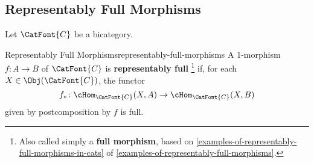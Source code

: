 \subsection{Representably Full Morphisms}\label{subsection-full-monomorphisms}
Let $\CatFont{C}$ be a bicategory.
\begin{definition}{Representably Full Morphisms}{representably-full-morphisms}%
    A $1$-morphism $f\colon A\to B$ of $\CatFont{C}$ is \textbf{representably full}%
    \footnote{%
        Also called simply a \textbf{full morphism}, based on \cref{examples-of-representably-full-morphisms-in-cats} of \cref{examples-of-representably-full-morphisms}.
        \par\vspace*{\TCBBoxCorrection}
    } %
    if, for each $X\in\Obj(\CatFont{C})$, the functor
    \[
        f_{*}%
        \colon%
        \cHom_{\CatFont{C}}(X,A)%
        \to%
        \cHom_{\CatFont{C}}(X,B)%
    \]%
    given by postcomposition by $f$ is full.
\end{definition}
